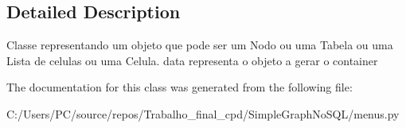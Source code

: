 \subsection{Detailed Description}
\begin{DoxyVerb}Classe representando um objeto que pode ser um Nodo ou uma Tabela ou uma Lista de celulas ou uma Celula. data representa o objeto a gerar o container
\end{DoxyVerb}
 

The documentation for this class was generated from the following file\+:\begin{DoxyCompactItemize}
\item 
C\+:/\+Users/\+P\+C/source/repos/\+Trabalho\+\_\+final\+\_\+cpd/\+Simple\+Graph\+No\+S\+Q\+L/menus.\+py\end{DoxyCompactItemize}
